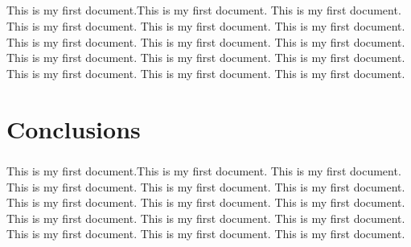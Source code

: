 \documentclass{report}
\begin{document}
	\paragraph{}
	
	This is my first document.This is my first document. This is my first document. This is my first document. This is my first document. This is my first document. This is my first document. This is my first document. This is my first document. This is my first document. This is my first document. This is my first document. This is my first document. This is my first document. This is my first document.
	
	\chapter{Conclusions}
	\paragraph{}
	
	This is my first document.This is my first document. This is my first document. This is my first document. This is my first document. This is my first document. This is my first document. This is my first document. This is my first document. This is my first document. This is my first document. This is my first document. This is my first document. This is my first document. This is my first document.
	
\end{document}
